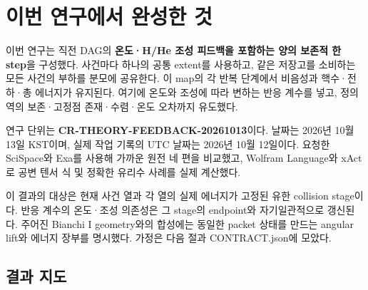 \hypertarget{uxc774uxbc88-uxc5f0uxad6cuxc5d0uxc11c-uxc644uxc131uxd55c-uxac83}{%
\section{이번 연구에서 완성한 것}\label{uxc774uxbc88-uxc5f0uxad6cuxc5d0uxc11c-uxc644uxc131uxd55c-uxac83}}

이번 연구는 직전 DAG의 \textbf{온도·H/He 조성 피드백을 포함하는 양의 보존적 한 step}을 구성했다. 사건마다 하나의 공통 extent를 사용하고, 같은 저장고를 소비하는 모든 사건의 부하를 분모에 공유한다. 이 map의 각 반복 단계에서 비음성과 핵수·전하·총 에너지가 유지된다. 여기에 온도와 조성에 따라 변하는 반응 계수를 넣고, 정의역의 보존·고정점 존재·수렴·온도 오차까지 유도했다.

연구 단위는 \textbf{CR-THEORY-FEEDBACK-20261013}이다. 날짜는 2026년 10월 13일 KST이며, 실제 작업 기록의 UTC 날짜는 2026년 10월 12일이다. 요청한 SciSpace와 Exa를 사용해 가까운 원전 네 편을 비교했고, Wolfram Language와 xAct로 공변 텐서 식 및 정확한 유리수 사례를 실제 계산했다.

이 결과의 대상은 현재 사건 열과 각 열의 실제 에너지가 고정된 유한 collision stage이다. 반응 계수의 온도·조성 의존성은 그 stage의 endpoint와 자기일관적으로 갱신된다. 주어진 Bianchi I geometry와의 합성에는 동일한 packet 상태를 만드는 angular lift와 에너지 장부를 명시했다. 가정은 다음 절과 CONTRACT.json에 모았다.

\hypertarget{uxacb0uxacfc-uxc9c0uxb3c4}{%
\subsection{결과 지도}\label{uxacb0uxacfc-uxc9c0uxb3c4}}

